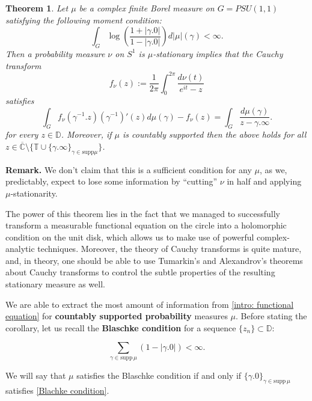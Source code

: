 \documentclass[11pt]{article}
\newtheorem{theorem}{Theorem}[section]
\begin{document}
\begin{theorem}
	\label{T:main result}
	Let $\mu$ be a complex finite Borel measure on $G=PSU(1,1)$ satisfying the following moment condition:
	\begin{equation}
		\int_{G} \log\left( \frac{1 + |\gamma.0| }{1 - |\gamma.0|} \right)  d |\mu| (\gamma) < \infty.
	\end{equation}
	Then a probability measure $\nu$ on $S^1$ is $\mu$-stationary implies that the Cauchy transform 
	\[
	f_\nu(z) := \frac{1}{2\pi} \int_{0}^{2\pi} \dfrac{d\nu(t)}{e^{it} - z}
	\] 
	satisfies
	\begin{equation}
		\label{intro: functional equation}
		\int_G f_\nu(\gamma^{-1}.z)(\gamma^{-1})'(z)  d\mu(\gamma) - f_\nu(z) = \int_G \frac{d \mu(\gamma)}{z - \gamma.\infty}.
	\end{equation}
	for every $z \in \mathbb{D}$. Moreover, if $\mu$ is countably supported then the above holds for all \\ $z \in \overline{\mathbb{C}} \setminus \{ \mathbb{T} \cup \{ \gamma.\infty \}_{\gamma \in \text{supp} \mu } \}$.
\end{theorem}

\textbf{Remark.} We don't claim that this is a sufficient condition for any $\mu$, as we, predictably, expect to lose some information by ``cutting'' $\nu$ in half and applying $\mu$-stationarity.

The power of this theorem lies in the fact that we managed to successfully transform a measurable functional equation on the circle into a holomorphic condition on the unit disk, which allows us to make use of powerful complex-analytic techniques. Moreover, the theory of Cauchy transforms is quite mature, and, in theory, one should be able to use Tumarkin's and Alexandrov's theorems about Cauchy transforms to control the subtle properties of the resulting stationary measure as well.

We are able to extract the most amount of information from \eqref{intro: functional equation} for \textbf{countably supported probability} measures $\mu$. Before stating the corollary, let us recall the \textbf{Blaschke condition} for a sequence $\{ z_n \} \subset \mathbb{D}$:

\begin{equation}
	\label{Blachke condition}
	\sum_{\gamma \in \text{supp} \, \mu} (1 - |\gamma.0|) < \infty.
\end{equation}

We will say that $\mu$ satisfies the Blaschke condition if and only if $\{ \gamma.0 \}_{\gamma \in \text{supp} \, \mu}$ satisfies \eqref{Blachke condition}.
\end{document}
